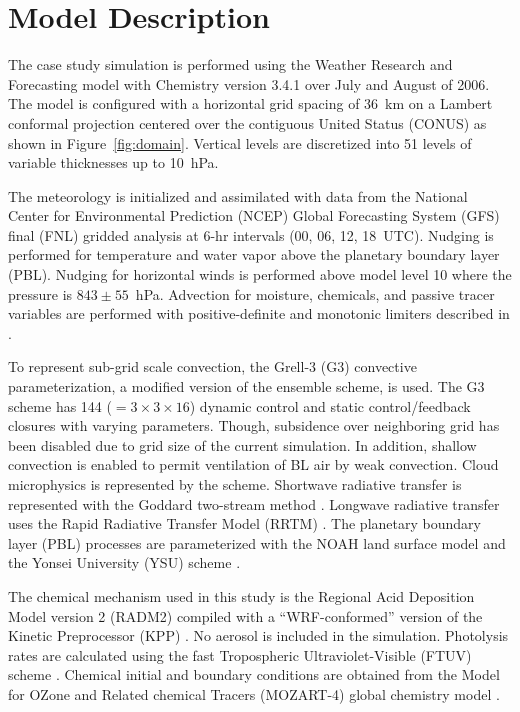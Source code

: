 \section{Model Description}\label{sect:setup}

The case study simulation is performed using the Weather Research and Forecasting model
\citep{Skamarock:2008xx} with Chemistry \citep[WRF-Chem;][]{Grell:2005fv} version 3.4.1
over July and August of 2006. The model is configured with a horizontal grid spacing of 36~km
on a Lambert conformal projection centered over the contiguous United Status (CONUS) as
shown in Figure~\ref{fig:domain}. Vertical levels are discretized into 51 levels of variable thicknesses
up to 10~hPa.

The meteorology is initialized and assimilated with data from the National Center for Environmental
Prediction (NCEP) Global Forecasting System (GFS) final (FNL) gridded analysis at 6-hr intervals
(00, 06, 12, 18~UTC). Nudging is performed for temperature and water vapor above the planetary
boundary layer (PBL). Nudging for horizontal winds is performed above model level 10 where the
pressure is $843\pm55$~hPa. Advection for moisture, chemicals, and passive tracer
variables are performed with positive-definite and monotonic limiters described in
\citet{Skamarock:2006wm, Wang:2009fk}.

To represent sub-grid scale convection, the Grell-3 (G3) convective parameterization, a modified version of the
\citet{Grell:2002bs} ensemble scheme, is used. The G3 scheme has 144 ($=3\times3\times16$) dynamic control and
static control/feedback closures with varying parameters. Though, subsidence over neighboring grid has been
disabled due to grid size of the current simulation. In addition, shallow convection is
enabled to permit ventilation of BL air by weak convection.
Cloud microphysics is represented by the \citet{Thompson:2008vn}
scheme. Shortwave
radiative transfer is represented with the Goddard two-stream method \citep{Chou:1998kx}.
Longwave radiative transfer uses the
Rapid Radiative Transfer Model (RRTM) \citep{Mlawer:1997vn}. The planetary boundary layer (PBL)
processes are parameterized with the NOAH land surface model \citep{Chen:2001ys} and the
Yonsei University (YSU) scheme \citep{Hong:2006fk}.

The chemical mechanism used in this study is the Regional Acid Deposition Model version 2
(RADM2) \citep{Stockwell:1990ez} compiled with a ``WRF-conformed'' version of the Kinetic
Preprocessor (KPP) \citep{Sandu:2006jl}. No aerosol is included in the simulation. Photolysis
rates are calculated using the fast Tropospheric Ultraviolet-Visible (FTUV) scheme \citep{Tie:2003ve}.
Chemical initial and boundary conditions are obtained from the Model for OZone and Related
chemical Tracers (MOZART-4) global chemistry model \citep{Emmons:2010fk}.

